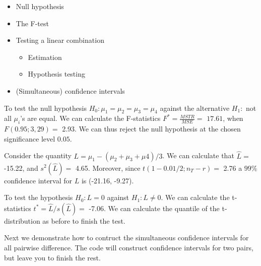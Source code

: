 \documentclass[12pt,]{book}
\providecommand{\tightlist}{%
  \setlength{\itemsep}{0pt}\setlength{\parskip}{0pt}}
\begin{document}
\begin{itemize}
\tightlist
\item
  Null hypothesis
\item
  The F-test
\item
  Testing a linear combination

  \begin{itemize}
  \tightlist
  \item
    Estimation
  \item
    Hypothesis testing
  \end{itemize}
\item
  (Simultaneous) confidence intervals
\end{itemize}

To test the null hypothesis \(H_0: \mu_1=\mu_2=\mu_3=\mu_4\) against the
alternative \(H_1:\) not all \(\mu_i\)'s are equal. We can calculate the
F-statistics \(F^*=\frac{MSTR}{MSE}=\) \(17.61\), when \(F(0.95;3,29)=\)
2.93. We can thus reject the null hypothesis at the chosen significance
level \(0.05\).

Consider the quantity \(L=\mu_1-(\mu_2+\mu_3+\mu4)/3\). We can calculate
that \(\hat{L}=\) -15.22, and \(s^2(\hat{L})=\) 4.65. Moreover, since
\(t(1-0.01/2;n_T-r)=\) 2.76 a \(99\%\) confidence interval for \(L\) is
(-21.16, -9.27).

To test the hypothesis \(H_0: L=0\) against \(H_1: L \neq 0\). We can
calculate the t-statistics \(t^*=\hat{L}/s(\hat{L})=\) -7.06. We can
calculate the quantile of the t-distribution as before to finish the
test.

Next we demonstrate how to contruct the simultaneous confidence
intervals for all pairwise difference. The code will construct
confidence intervals for two pairs, but leave you to finish the rest.
\end{document}
